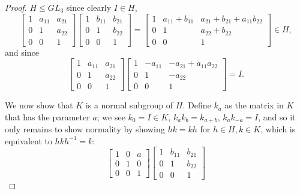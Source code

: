 \documentclass[12pt]{article}
\theoremstyle{remark}
\newcommand{\GL}{\mathit{GL}}
\begin{document}
\begin{proof}
  $H \leqslant \GL_3$ since clearly $I \in H$,
  \begin{equation*}
    \begin{bmatrix}
      1 & a_{11} & a_{21}\\
      0 & 1 & a_{22}\\
      0 & 0 & 1
    \end{bmatrix}
    \begin{bmatrix}
      1 & b_{11} & b_{21}\\
      0 & 1 & b_{22}\\
      0 & 0 & 1
    \end{bmatrix} =
    \begin{bmatrix}
      1 & a_{11}+b_{11} & a_{21} + b_{21} + a_{11}b_{22}\\
      0 & 1 & a_{22} + b_{22}\\
      0 & 0 & 1
    \end{bmatrix} \in H,
  \end{equation*}
  and since
  \begin{equation*}
    \begin{bmatrix}
      1 & a_{11} & a_{21}\\
      0 & 1 & a_{22}\\
      0 & 0 & 1
    \end{bmatrix}
    \begin{bmatrix}
      1 & -a_{11} & -a_{21}+a_{11}a_{22}\\
      0 & 1 & -a_{22}\\
      0 & 0 & 1
    \end{bmatrix} = I.
  \end{equation*}
  \par We now show that $K$ is a normal subgroup of $H$. Define $k_a$ as the matrix in $K$ that has the parameter $a$; we see $k_0 = I \in K$, $k_ak_b = k_{a+b}$, $k_ak_{-a} = I$, and so it only remains to show normality by showing $hk = kh$ for $h \in H, k \in K$, which is equivalent to $hkh^{-1} = k$:
  \begin{equation*}
    \begin{bmatrix}
      1 & 0 & a\\
      0 & 1 & 0\\
      0 & 0 & 1
    \end{bmatrix}
    \begin{bmatrix}
      1 & b_{11} & b_{21}\\
      0 & 1 & b_{22}\\
      0 & 0 & 1

\end{bmatrix}
\end{equation*}
\end{proof}
\end{document}
